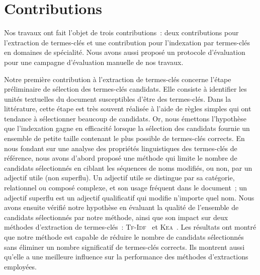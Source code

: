   \section{Contributions}
  \label{sec:main-conclusion-contributions}
    Nos travaux ont fait l'objet de trois contributions~: deux contributions
    pour l'extraction de termes-clés et une contribution pour l'indexation par
    termes-clés en domaines de spécialité. Nous avons aussi proposé un
    protocole d'évaluation pour une campagne d'évaluation manuelle de nos
    travaux.

    Notre première contribution à l'extraction de termes-clés concerne l'étape
    préliminaire de sélection des termes-clés candidats. Elle consiste à
    identifier les unités textuelles du document susceptibles d'être des
    termes-clés. Dans la littérature, cette étape est très souvent réalisée à
    l'aide de règles simples qui ont tendance à sélectionner beaucoup de
    candidats. Or, nous émettons l'hypothèse que l'indexation gagne en
    efficacité lorsque la sélection des candidats fournie un ensemble de petite
    taille contenant le plus possible de termes-clés corrects.
    En nous fondant sur une analyse des propriétés linguistiques des termes-clés
    de référence, nous avons d'abord proposé une méthode qui limite le nombre de
    candidats sélectionnés en ciblant les séquences de noms modifiés, ou non,
    par un adjectif utile (non superflu). Un adjectif utile se distingue par sa
    catégorie, relationnel ou composé complexe, et son usage fréquent dans le
    document~; un adjectif superflu est un adjectif qualificatif qui modifie
    n'importe quel nom.
    Nous avons ensuite vérifié notre hypothèse en évaluant la qualité de
    l'ensemble de candidats sélectionnés par notre méthode, ainsi que son impact
    sur deux méthodes d'extraction de termes-clés~:
    \textsc{Tf-Idf}~\cite{salton1975tfidf} et \textsc{Kea}~\cite{witten1999kea}.
    Les résultats ont montré que notre méthode est capable de réduire le nombre
    de candidats sélectionnés sans éliminer un nombre significatif de
    termes-clés corrects. Ils montrent aussi qu'elle a une meilleure influence
    sur la performance des méthodes d'extractions employées.

